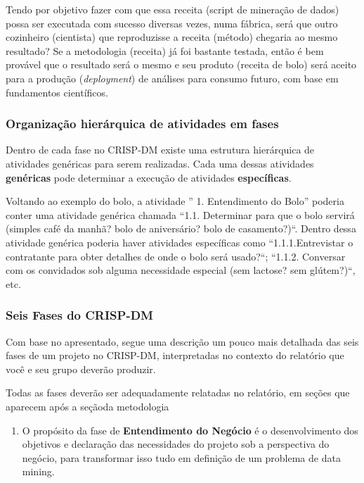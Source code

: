 \documentclass[]{article}
\providecommand{\tightlist}{%
  \setlength{\itemsep}{0pt}\setlength{\parskip}{0pt}}
\begin{document}
Tendo por objetivo fazer com que essa receita (script de mineração de
dados) possa ser executada com sucesso diversas vezes, numa fábrica,
será que outro cozinheiro (cientista) que reproduzisse a receita
(método) chegaria ao mesmo resultado? Se a metodologia (receita) já foi
bastante testada, então é bem provável que o resultado será o mesmo e
seu produto (receita de bolo) será aceito para a produção
(\emph{deployment}) de análises para consumo futuro, com base em
fundamentos científicos.

\subsubsection{Organização hierárquica de atividades em
fases}\label{organizacao-hierarquica-de-atividades-em-fases}

Dentro de cada fase no CRISP-DM existe uma estrutura hierárquica de
atividades genéricas para serem realizadas. Cada uma dessas atividades
\textbf{genéricas} pode determinar a execução de atividades
\textbf{específicas}.

Voltando ao exemplo do bolo, a atividade '' 1. Entendimento do Bolo''
poderia conter uma atividade genérica chamada ``1.1. Determinar para que
o bolo servirá (simples café da manhã? bolo de aniversário? bolo de
casamento?)``. Dentro dessa atividade genérica poderia haver atividades
específicas como ``1.1.1.Entrevistar o contratante para obter detalhes
de onde o bolo será usado?``; ``1.1.2. Conversar com os convidados sob
alguma necessidade especial (sem lactose? sem glútem?)``, etc.

\subsubsection{Seis Fases do CRISP-DM}\label{seis-fases-do-crisp-dm}

Com base no apresentado, segue uma descrição um pouco mais detalhada das
seis fases de um projeto no CRISP-DM, interpretadas no contexto do
relatório que você e seu grupo deverão produzir.

Todas as fases deverão ser adequadamente relatadas no relatório, em
seções que aparecem após a seçãoda metodologia

\begin{enumerate}
\def\labelenumi{\arabic{enumi}.}
\tightlist
\item
  O propósito da fase de \textbf{Entendimento do Negócio} é o
  desenvolvimento dos objetivos e declaração das necessidades do projeto
  sob a perspectiva do negócio, para transformar isso tudo em definição
  de um problema de data mining.
\end{enumerate}
\end{document}
